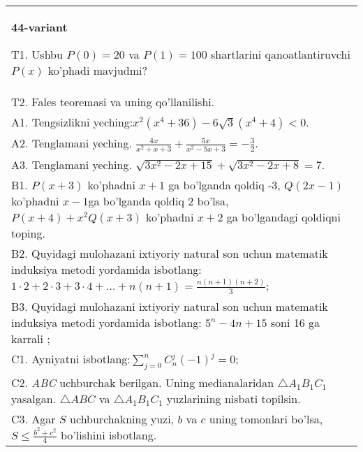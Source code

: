 \documentclass{article}
\begin{document}
\begin{tabular}{m{17cm}}
\textbf{44-variant}
\newline

T1. Ushbu \(P(0) = 20\) va \(P(1) = 100\) shartlarini qanoatlantiruvchi \(P(x)\) ko'phadi mavjudmi? \\
T2. Fales teoremasi va uning qo'llanilishi. \\
A1. Tengsizlikni yeching:\(x^{2}\left( x^{4} + 36 \right) - 6\sqrt{3}\left( x^{4} + 4 \right) < 0\). \\
A2. Tenglamani yeching. \(\frac{4x}{x^{2} + x + 3} + \frac{5x}{x^{2} - 5x + 3} = - \frac{3}{2}\). \\
A3. Tenglamani yeching. \(\sqrt{3x^{2} - 2x + 15} + \sqrt{3x^{2} - 2x + 8} = 7\). \\
B1. \(P(x + 3)\) ko'phadni \(x + 1\) ga bo'lganda qoldiq -3, \(Q(2x - 1)\) ko'phadni \(x - 1\)ga bo'lganda qoldiq 2 bo'lsa, \(P(x + 4) + x^{2}Q(x + 3)\) ko'phadni \(x + 2\) ga bo'lgandagi qoldiqni toping. \\
B2. Quyidagi mulohazani ixtiyoriy natural son uchun matematik induksiya metodi yordamida isbotlang: \(1 \cdot 2 + 2 \cdot 3 + 3 \cdot 4 + ... + n(n + 1) = \frac{n(n + 1)(n + 2)}{3}\); \\
B3. Quyidagi mulohazani ixtiyoriy natural son uchun matematik induksiya metodi yordamida isbotlang: \(5^{n} - 4n + 15\) soni 16 ga karrali ; \\
C1. Ayniyatni isbotlang:\(\sum_{j = 0}^{n}C_{n}^{j}( - 1)^{j} = 0\); \\
C2. \emph{ABC} uchburchak berilgan. Uning medianalaridan \(\bigtriangleup A_{1}B_{1}C_{1}\) yasalgan. \(\bigtriangleup ABC\) va \(\bigtriangleup A_{1}B_{1}C_{1}\) yuzlarining nisbati topilsin. \\
C3. Agar \(S\) uchburchakning yuzi, \(b\) va \(c\) uning tomonlari bo'lsa, \(S \leq \frac{b^{2} + c^{2}}{4}\) bo'lishini isbotlang. \\

\end{tabular}
\vspace{1cm}
\end{document}

